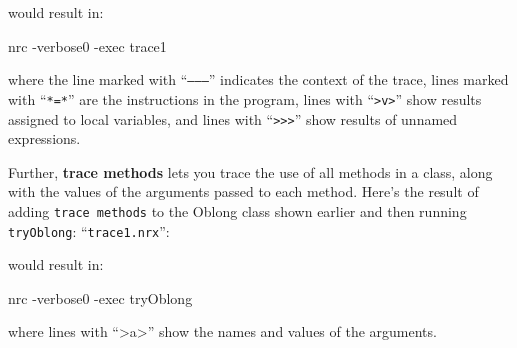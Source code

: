 would result in:

\begin{shaded}
\bash[stderr]
nrc -verbose0 -exec trace1
\END
\end{shaded}


where the line marked with “\texttt{–––}” indicates the context of the trace, lines marked with “\texttt{*=*}” are the instructions in the program, lines with “\texttt{>v>}” show results assigned to local variables, and lines with “\texttt{>>>}” show results of unnamed expressions.

Further, \textbf{trace methods} lets you trace the use of all methods in a
class, along with the values of the arguments passed to each
method. Here’s the result of adding \texttt{trace methods} to the Oblong class
shown earlier and then running \texttt{tryOblong}:
“\texttt{trace1.nrx}”:


would result in:

\begin{shaded}
\bash[stderr]
nrc -verbose0 -exec tryOblong
\END
\end{shaded}

where lines with “>a>” show the names and values of the arguments.

